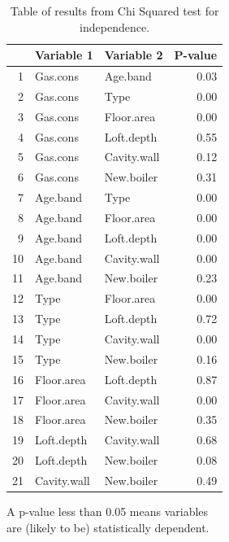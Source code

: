 \documentclass[8pt]{extarticle}
\begin{document}
\begin{table}[H]
	\centering
	\begin{tabular}{r|llr}
		\hline
		& Variable 1 & Variable 2 & P-value \\ 
		\hline
		1 & Gas.cons & Age.band & 0.03 \\ 
		2 & Gas.cons & Type & 0.00 \\ 
		3 & Gas.cons & Floor.area & 0.00 \\ 
		4 & Gas.cons & Loft.depth & 0.55 \\ 
		5 & Gas.cons & Cavity.wall & 0.12 \\ 
		6 & Gas.cons & New.boiler & 0.31 \\ 
		7 & Age.band & Type & 0.00 \\ 
		8 & Age.band & Floor.area & 0.00 \\ 
		9 & Age.band & Loft.depth & 0.00 \\ 
		10 & Age.band & Cavity.wall & 0.00 \\ 
		11 & Age.band & New.boiler & 0.23 \\ 
		12 & Type & Floor.area & 0.00 \\ 
		13 & Type & Loft.depth & 0.72 \\ 
		14 & Type & Cavity.wall & 0.00 \\ 
		15 & Type & New.boiler & 0.16 \\ 
		16 & Floor.area & Loft.depth & 0.87 \\ 
		17 & Floor.area & Cavity.wall & 0.00 \\ 
		18 & Floor.area & New.boiler & 0.35 \\ 
		19 & Loft.depth & Cavity.wall & 0.68 \\ 
		20 & Loft.depth & New.boiler & 0.08 \\ 
		21 & Cavity.wall & New.boiler & 0.49 \\ 
		\hline
	\end{tabular}

\vspace{0.5em}
A p-value less than 0.05 means variables \\are (likely to be) statistically dependent.
\caption{Table of results from Chi Squared test for independence. }
\label{tab:chi}
\end{table}
\end{document}
